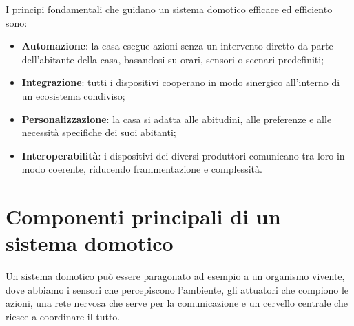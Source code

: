 I principi fondamentali che guidano un sistema domotico efficace ed efficiento sono:

\begin{itemize}
    \item \textbf{Automazione}: la casa esegue azioni senza un intervento diretto da parte dell'abitante della casa, basandosi su orari, sensori o scenari predefiniti;
    \item \textbf{Integrazione}: tutti i dispositivi cooperano in modo sinergico all’interno di un ecosistema condiviso;
    \item \textbf{Personalizzazione}: la casa si adatta alle abitudini, alle preferenze e alle necessità specifiche dei suoi abitanti;
    \item \textbf{Interoperabilità}: i dispositivi dei diversi produttori comunicano tra loro in modo coerente, riducendo frammentazione e complessità.
\end{itemize}

\section{Componenti principali di un sistema domotico}

Un sistema domotico può essere paragonato ad esempio a un organismo vivente, dove abbiamo i sensori che percepiscono l'ambiente, gli attuatori che compiono le azioni, una rete nervosa che serve per la comunicazione e un cervello centrale che riesce a coordinare il tutto.\\


